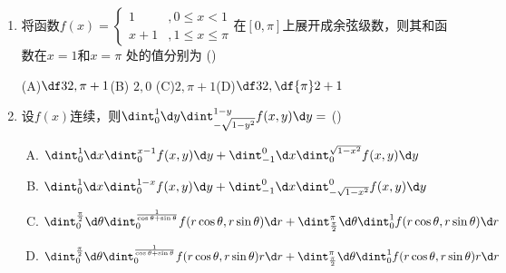 \begin{enumerate}
  (A)$\df34$\hspace{1cm}(B)$\df12$\hspace{1cm}
  (C)$-\df34$\hspace{1cm}(D)$-\df12$
  \item 将函数$f(x)=\left\{\begin{array}{ll}
  1&,0\leq x<1\\ x+1&,1\leq x\leq \pi
  \end{array}\right.$在$[0,\pi]$上展开成余弦级数，则其和函数在$x=1$和$x=\pi$
  处的值分别为
  (\underline{\hspace{1cm}})
  
  (A)$\df32,\pi+1$\hspace{1cm}(B) $2,0$\hspace{1cm}
  (C)$2,\pi+1$\hspace{1cm}(D)$\df32,\df{\pi}2+1$
  \item 设$f(x)$连续，则$\dint_0^1\d y\dint_{-\sqrt{1-y^2}}^{1-y}f(x,y)\d y=$
  (\underline{\hspace{1cm}})
  \begin{enumerate}[(A)]
    \item $\dint_0^1\d x\dint_{0}^{x-1}f(x,y)\d y
    +\dint_{-1}^0\d x\dint_0^{\sqrt{1-x^2}}f(x,y)\d y$
    \item $\dint_0^1\d x\dint_{0}^{1-x}f(x,y)\d y
    +\dint_{-1}^0\d x\dint_{-\sqrt{1-x^2}}^0f(x,y)\d y$
    \item $\dint_0^{\frac{\pi}2}\d\theta\dint_0^{\frac1{\cos\theta+\sin\theta}}
    f(r\cos\theta,r\sin\theta)\d r+\dint_{\frac{\pi}2}^{\pi}\d\theta
    \dint_0^1f(r\cos\theta,r\sin\theta)\d r$
    \item $\dint_0^{\frac{\pi}2}\d\theta\dint_0^{\frac1{\cos\theta+\sin\theta}}
    f(r\cos\theta,r\sin\theta)r\d r+\dint_{\frac{\pi}2}^{\pi}\d\theta
    \dint_0^1f(r\cos\theta,r\sin\theta)r\d r$
  \end{enumerate}
  
\end{enumerate}

